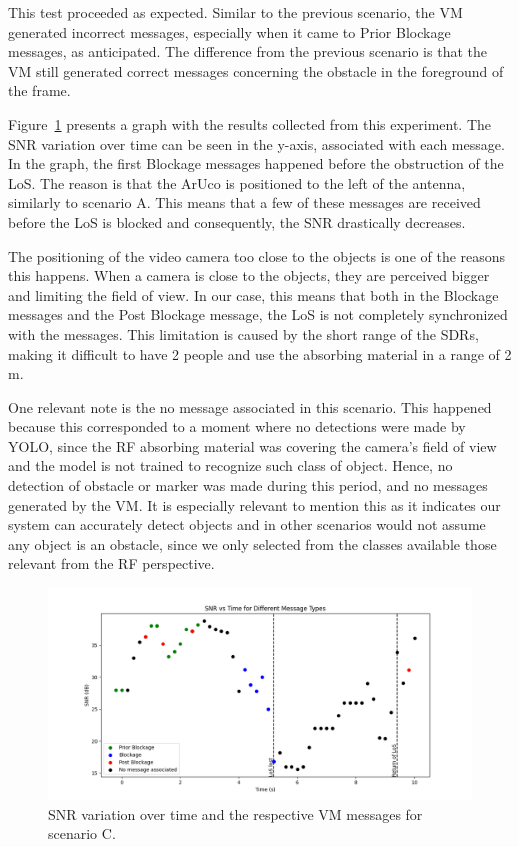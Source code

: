 This test proceeded as expected.
Similar to the previous scenario, the VM generated incorrect messages, especially when it came to Prior Blockage messages, as anticipated.
The difference from the previous scenario is that the VM still generated correct messages concerning the obstacle in the foreground of the frame.

Figure~\ref{fig:results_2} presents a graph with the results collected from this experiment.
The SNR variation over time can be seen in the y-axis, associated with each message.
In the graph, the first Blockage messages happened before the obstruction of the LoS\@.
The reason is that the ArUco is positioned to the left of the antenna, similarly to scenario A\@.
This means that a few of these messages are received before the LoS is blocked and consequently, the SNR drastically decreases.

The positioning of the video camera too close to the objects is one of the reasons this happens.
When a camera is close to the objects, they are perceived bigger and limiting the field of view.
In our case, this means that both in the Blockage messages and the Post Blockage message, the LoS is not completely synchronized with the messages.
This limitation is caused by the short range of the SDRs, making it difficult to have 2 people and use the absorbing material in a range of 2 m.

One relevant note is the no message associated in this scenario.
This happened because this corresponded to a moment where no detections were made by YOLO, since the RF absorbing material was covering the camera's field of view and the model is not trained to recognize such class of object.
Hence, no detection of obstacle or marker was made during this period, and no messages generated by the VM\@.
It is especially relevant to mention this as it indicates our system can accurately detect objects and in other scenarios would not assume any object is an obstacle, since we only selected from the classes available those relevant from the RF perspective.

\begin{figure}[H]
    \centering
    \includegraphics[width=\linewidth]{figures/results_2}
    \caption{SNR variation over time and the respective VM messages for scenario C.}
    \label{fig:results_2}
\end{figure}

